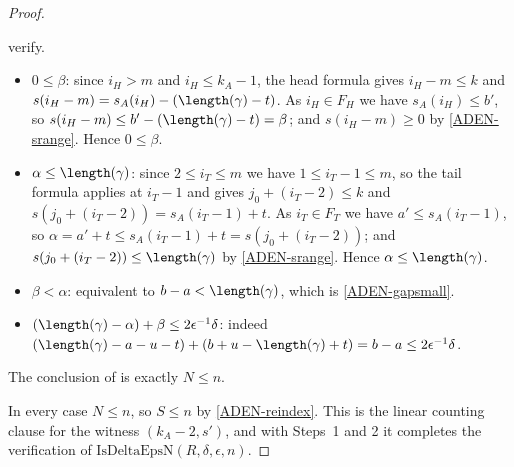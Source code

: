 \begin{proof}
\begin{itemize}
      verify.
      \begin{itemize}
        \item $0\le\beta$: since $i_H>m$ and $i_H\le k_A-1$, the head formula gives $i_H-m\le k$
          and $s(i_H-m)=s_A(i_H)-(\length(\gamma)-t)$. As $i_H\in F_H$ we have $s_A(i_H)\le b'$,
          so $s(i_H-m)\le b'-(\length(\gamma)-t)=\beta$; and $s(i_H-m)\ge0$ by
          \eqref{ADEN-srange}. Hence $0\le\beta$.
        \item $\alpha\le\length(\gamma)$: since $2\le i_T\le m$ we have $1\le i_T-1\le m$, so the
          tail formula applies at $i_T-1$ and gives $j_0+(i_T-2)\le k$ and
          $s(j_0+(i_T-2))=s_A(i_T-1)+t$. As $i_T\in F_T$ we have $a'\le s_A(i_T-1)$, so
          $\alpha=a'+t\le s_A(i_T-1)+t=s(j_0+(i_T-2))$; and $s(j_0+(i_T-2))\le\length(\gamma)$ by
          \eqref{ADEN-srange}. Hence $\alpha\le\length(\gamma)$.
        \item $\beta<\alpha$: equivalent to $b-a<\length(\gamma)$, which is
          \eqref{ADEN-gapsmall}.
        \item $(\length(\gamma)-\alpha)+\beta\le2\epsilon^{-1}\delta$: indeed
          $(\length(\gamma)-a-u-t)+(b+u-\length(\gamma)+t) = b-a \le 2\epsilon^{-1}\delta$.
      \end{itemize}
  \end{itemize}
  The conclusion of  is exactly $N\le n$.

  In every case $N\le n$, so $S\le n$ by \eqref{ADEN-reindex}. This is the linear counting clause
  for the witness $(k_A-2,s')$, and with Steps~1 and 2 it completes the verification of
  $\mathrm{IsDeltaEpsN}(R,\delta,\epsilon,n)$.
\end{proof}
